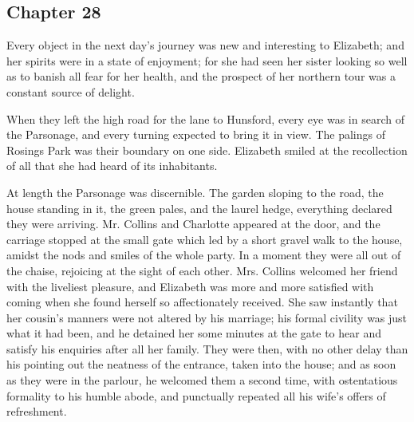 \subsection[chapter-28]{\useURL[url28][][][]\from[url28] Chapter 28}

Every object in the next day's journey was new and interesting to Elizabeth; and her spirits were in a state of enjoyment; for she had seen her sister looking so well as to banish all fear for her health, and the prospect of her northern tour was a constant source of delight.

When they left the high road for the lane to Hunsford, every eye was in search of the Parsonage, and every turning expected to bring it in view. The palings of Rosings Park was their boundary on one side. Elizabeth smiled at the recollection of all that she had heard of its inhabitants.

At length the Parsonage was discernible. The garden sloping to the road, the house standing in it, the green pales, and the laurel hedge, everything declared they were arriving. Mr. Collins and Charlotte appeared at the door, and the carriage stopped at the small gate which led by a short gravel walk to the house, amidst the nods and smiles of the whole party. In a moment they were all out of the chaise, rejoicing at the sight of each other. Mrs. Collins welcomed her friend with the liveliest pleasure, and Elizabeth was more and more satisfied with coming when she found herself so affectionately received. She saw instantly that her cousin's manners were not altered by his marriage; his formal civility was just what it had been, and he detained her some minutes at the gate to hear and satisfy his enquiries after all her family. They were then, with no other delay than his pointing out the neatness of the entrance, taken into the house; and as soon as they were in the parlour, he welcomed them a second time, with ostentatious formality to his humble abode, and punctually repeated all his wife's offers of refreshment.

